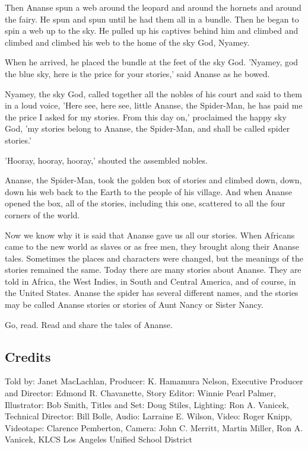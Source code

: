 Then Ananse spun a web around the leopard and around the hornets and around the fairy. He spun and spun until he had them all in a bundle. Then he began to spin a web up to the sky. He pulled up his captives behind him and climbed and climbed and climbed his web to the home of the sky God, Nyamey.

When he arrived, he placed the bundle at the feet of the sky God. 'Nyamey, god the blue sky, here is the price for your stories,' said Ananse as he bowed.

Nyamey, the sky God, called together all the nobles of his court and said to them in a loud voice, 'Here see, here see, little Ananse, the Spider-Man, he has paid me the price I asked for my stories. From this day on,' proclaimed the happy sky God, 'my stories belong to Ananse, the Spider-Man, and shall be called spider stories.'

'Hooray, hooray, hooray,' shouted the assembled nobles.

Ananse, the Spider-Man, took the golden box of stories and climbed down, down, down his web back to the Earth to the people of his village. And when Ananse opened the box, all of the stories, including this one, scattered to all the four corners of the world.

Now we know why it is said that Ananse gave us all our stories. When Africans came to the new world as slaves or as free men, they brought along their Ananse tales. Sometimes the places and characters were changed, but the meanings of the stories remained the same. Today there are many stories about Ananse. They are told in Africa, the West Indies, in South and Central America, and of course, in the United States. Ananse the spider has several different names, and the stories may be called Ananse stories or stories of Aunt Nancy or Sister Nancy.

Go, read. Read and share the tales of Ananse.

\subsection{Credits}

Told by: Janet MacLachlan,
Producer: K. Hamamura Nelson,
Executive Producer and Director: Edmond R. Chavanette,
Story Editor: Winnie Pearl Palmer,
Illustrator: Bob Smith,
Titles and Set: Doug Stiles,
Lighting: Ron A. Vanicek,
Technical Director: Bill Bolle,
Audio: Larraine E. Wilson,
Video: Roger Knipp,
Videotape: Clarence Pemberton,
Camera: John C. Merritt, Martin Miller, Ron A. Vanicek,
KLCS Los Angeles Unified School District

